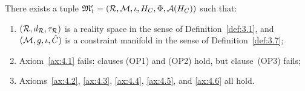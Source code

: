 \begin{lemma}
\label{lem:4.1.gs1.replacement}
There exists a tuple $\mathfrak{M}_1' = (\mathcal{R},\mathcal{M},\iota,H_C,\Phi,
\mathcal{A}(H_C))$ such that:
\begin{enumerate}
  \item[\textup{(i)}] $(\mathcal{R},d_{\mathcal{R}},\tau_{\mathcal{R}})$ is a reality space
    in the sense of Definition~\textup{\ref{def:3.1}}, and
    $(\mathcal{M},g,\iota,\hat{C})$ is a constraint manifold in the sense of
    Definition~\textup{\ref{def:3.7}};
  \item[\textup{(ii)}] Axiom~\textup{\ref{ax:4.1}} fails: clauses
    \textup{(OP1)} and \textup{(OP2)} hold, but clause~\textup{(OP3)}
    fails;
  \item[\textup{(iii)}] Axioms~\textup{\ref{ax:4.2}},
    \textup{\ref{ax:4.3}}, \textup{\ref{ax:4.4}},
    \textup{\ref{ax:4.5}}, and \textup{\ref{ax:4.6}} all hold.
\end{enumerate}
\end{lemma}

